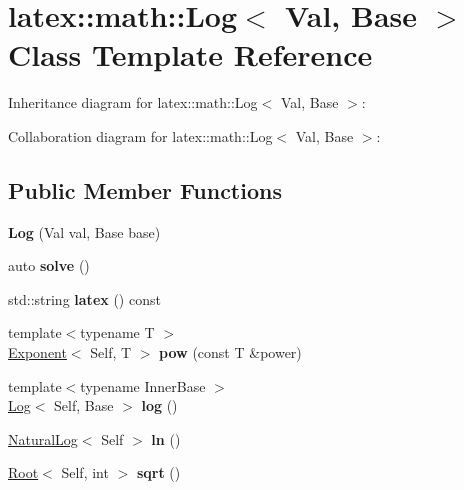 \hypertarget{classlatex_1_1math_1_1Log}{\section{latex\-:\-:math\-:\-:\-Log$<$ \-Val, \-Base $>$ \-Class \-Template \-Reference}
\label{classlatex_1_1math_1_1Log}
}


\-Inheritance diagram for latex\-:\-:math\-:\-:\-Log$<$ \-Val, \-Base $>$\-:


\-Collaboration diagram for latex\-:\-:math\-:\-:\-Log$<$ \-Val, \-Base $>$\-:
\subsection*{\-Public \-Member \-Functions}
\begin{DoxyCompactItemize}
\item 
\hypertarget{classlatex_1_1math_1_1Log_acff6d6f36adff38cf7c0da719516c6bc}{{\bfseries \-Log} (\-Val val, \-Base base)}\label{classlatex_1_1math_1_1Log_acff6d6f36adff38cf7c0da719516c6bc}

\item 
\hypertarget{classlatex_1_1math_1_1Log_a5d9819331208c23d8978a3744d058f14}{auto {\bfseries solve} ()}\label{classlatex_1_1math_1_1Log_a5d9819331208c23d8978a3744d058f14}

\item 
\hypertarget{classlatex_1_1math_1_1Log_a1bc90c91e52e7858e33dcdaba673b7a9}{std\-::string {\bfseries latex} () const }\label{classlatex_1_1math_1_1Log_a1bc90c91e52e7858e33dcdaba673b7a9}

\item 
\hypertarget{classlatex_1_1math_1_1Log_a4819a4a9a01dd7dd65a0d2773c589976}{{\footnotesize template$<$typename T $>$ }\\\hyperlink{classlatex_1_1math_1_1Exponent}{\-Exponent}$<$ \-Self, \-T $>$ {\bfseries pow} (const \-T \&power)}\label{classlatex_1_1math_1_1Log_a4819a4a9a01dd7dd65a0d2773c589976}

\item 
\hypertarget{classlatex_1_1math_1_1Log_aacf7a5312839b22b33fcb67ed3f51fde}{{\footnotesize template$<$typename Inner\-Base $>$ }\\\hyperlink{classlatex_1_1math_1_1Log}{\-Log}$<$ \-Self, \-Base $>$ {\bfseries log} ()}\label{classlatex_1_1math_1_1Log_aacf7a5312839b22b33fcb67ed3f51fde}

\item 
\hypertarget{classlatex_1_1math_1_1Log_a6ae7bf3b1ce862280b67b58f69d5c793}{\hyperlink{classlatex_1_1math_1_1NaturalLog}{\-Natural\-Log}$<$ \-Self $>$ {\bfseries ln} ()}\label{classlatex_1_1math_1_1Log_a6ae7bf3b1ce862280b67b58f69d5c793}

\item 
\hypertarget{classlatex_1_1math_1_1Log_a980f02ee52b6b81f1c7e7ccf75521a67}{\hyperlink{classlatex_1_1math_1_1Root}{\-Root}$<$ \-Self, int $>$ {\bfseries sqrt} ()}\label{classlatex_1_1math_1_1Log_a980f02ee52b6b81f1c7e7ccf75521a67}

\end{DoxyCompactItemize}
